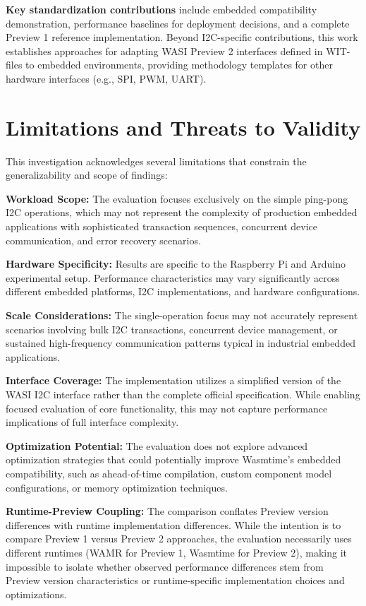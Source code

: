\textbf{Key standardization contributions} include embedded compatibility demonstration, performance baselines for deployment decisions, and a complete Preview 1 reference implementation. Beyond I2C-specific contributions, this work establishes approaches for adapting WASI Preview 2 interfaces defined in WIT-files to embedded environments, providing methodology templates for other hardware interfaces (e.g., SPI, PWM, UART).

\section*{Limitations and Threats to Validity}
\label{sec:limitations}

This investigation acknowledges several limitations that constrain the generalizability and scope of findings:

\textbf{Workload Scope:} The evaluation focuses exclusively on the simple ping-pong I2C operations, which may not represent the complexity of production embedded applications with sophisticated transaction sequences, concurrent device communication, and error recovery scenarios.

\textbf{Hardware Specificity:} Results are specific to the Raspberry Pi and Arduino experimental setup. Performance characteristics may vary significantly across different embedded platforms, I2C implementations, and hardware configurations.

\textbf{Scale Considerations:} The single-operation focus may not accurately represent scenarios involving bulk I2C transactions, concurrent device management, or sustained high-frequency communication patterns typical in industrial embedded applications.

\textbf{Interface Coverage:} The implementation utilizes a simplified version of the WASI I2C interface rather than the complete official specification. While enabling focused evaluation of core functionality, this may not capture performance implications of full interface complexity.

\textbf{Optimization Potential:} The evaluation does not explore advanced optimization strategies that could potentially improve Wasmtime's embedded compatibility, such as ahead-of-time compilation, custom component model configurations, or memory optimization techniques.

\textbf{Runtime-Preview Coupling:} The comparison conflates Preview version differences with runtime implementation differences. While the intention is to compare Preview 1 versus Preview 2 approaches, the evaluation necessarily uses different runtimes (WAMR for Preview 1, Wasmtime for Preview 2), making it impossible to isolate whether observed performance differences stem from Preview version characteristics or runtime-specific implementation choices and optimizations.

















